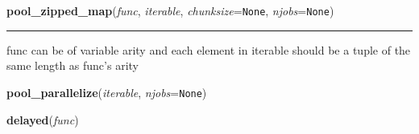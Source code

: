     \vspace{0.5ex}

\hspace{.8\funcindent}\begin{boxedminipage}{\funcwidth}

    \raggedright \textbf{pool\_zipped\_map}(\textit{func}, \textit{iterable}, \textit{chunksize}={\tt None}, \textit{njobs}={\tt None})

    \vspace{-1.5ex}

    \rule{\textwidth}{0.5\fboxrule}
\setlength{\parskip}{2ex}
    func can be of variable arity and each element in iterable should be a 
    tuple of the same length as func's arity

\setlength{\parskip}{1ex}
    \end{boxedminipage}

    \label{pycosmicstar:parallellistcompreension:pool_parallelize}

    \vspace{0.5ex}

\hspace{.8\funcindent}\begin{boxedminipage}{\funcwidth}

    \raggedright \textbf{pool\_parallelize}(\textit{iterable}, \textit{njobs}={\tt None})

\setlength{\parskip}{2ex}
\setlength{\parskip}{1ex}
    \end{boxedminipage}

    \label{pycosmicstar:parallellistcompreension:delayed}

    \vspace{0.5ex}

\hspace{.8\funcindent}\begin{boxedminipage}{\funcwidth}

    \raggedright \textbf{delayed}(\textit{func})

\setlength{\parskip}{2ex}
\setlength{\parskip}{1ex}
    \end{boxedminipage}

    \label{pycosmicstar:parallellistcompreension:parallelized}

